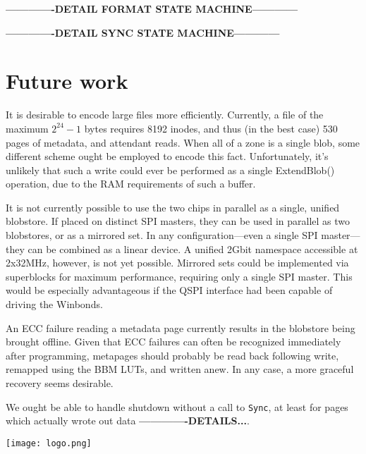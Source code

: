 \documentclass[letterpaper,10pt]{article}
\begin{document}
\textbf{-------------DETAIL FORMAT STATE MACHINE------------}

\textbf{-------------DETAIL SYNC STATE MACHINE------------}

\section{Future work} \label{futurework}
It is desirable to encode large files more efficiently. Currently, a file of
the maximum $2^{24}-1$ bytes requires 8192 inodes, and thus (in the best case)
530 pages of metadata, and attendant reads. When all of a zone is a single
blob, some different scheme ought be employed to encode this fact.
Unfortunately, it's unlikely that such a write could ever be performed as a
single ExtendBlob() operation, due to the RAM requirements of such a buffer.

It is not currently possible to use the two chips in parallel as a single,
unified blobstore. If placed on distinct SPI masters, they can be used in
parallel as two blobstores, or as a mirrored set. In any configuration---even
a single SPI master---they can be combined as a linear device. A unified
2Gbit namespace accessible at 2x32MHz, however, is not yet possible. Mirrored
sets could be implemented via superblocks for
maximum performance, requiring only a single SPI master. This would be especially
advantageous if the QSPI interface had been capable of driving the Winbonds.

An ECC failure reading a metadata page currently results in the blobstore being
brought offline. Given that ECC failures can often be recognized immediately
after programming, metapages should probably be read back following write,
remapped using the BBM LUTs, and written anew. In any case, a more graceful
recovery seems desirable.

We ought be able to handle shutdown without a call to \texttt{Sync}, at least
for pages which actually wrote out data \textbf{-------------DETAILS...}.

\printbibliography

\begin{center}
\texttt{[image: logo.png]}
\end{center}
\end{document}
